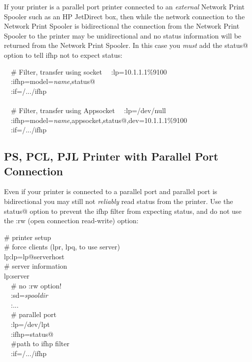 \documentclass[a4paper]{article}
\begin{document}
If your printer is a parallel port printer
connected to an {\itshape external\/} Network Print Spooler such as an HP JetDirect box,
then while the network connection to the Network Print Spooler is
bidirectional
the connection from the Network Print Spooler to the printer 
may be unidirectional
and no status information will be returned from the Network Print Spooler.
In this case you {\itshape must\/} add the {\ttfamily status@}
option to tell {\ttfamily ifhp} not to expect status:
\begin{tscreen}
~~\# Filter, transfer using socket
~~:lp=10.1.1.1\%9100 \\ 
~~:ifhp=model={\itshape name\/},status@\\ 
~~:if=/.../ifhp  \\ \\ 
~~\# Filter, transfer using Appsocket
~~:lp=/dev/null \\ 
~~:ifhp=model={\itshape name\/},appsocket,status@,dev=10.1.1.1\%9100 \\ 
~~:if=/.../ifhp  \\ 
\end{tscreen}



\subsection{PS, PCL, PJL Printer with Parallel Port Connection}

Even if your printer is connected to a parallel port
and parallel port is bidirectional
you may still not {\itshape reliably\/} read status from the printer.
Use the
{\ttfamily status@} option to prevent the
{\ttfamily ifhp} filter from expecting status,
and do not  use the
{\ttfamily :rw} (open connection read-write) option:
\begin{tscreen}
\# printer setup  \\ 
\#  force clients (lpr, lpq, to use server)  \\ 
lp:lp=lp@serverhost  \\ 
\# server information  \\ 
lp:server  \\ 
~~\# no :rw option! \\ 
~~:sd={\itshape spooldir\/}  \\ 
~~:...  \\ 
~~\# parallel port \\ 
~~:lp=/dev/lpt\\ 
~~:ifhp=status@ \\ 
~~\#path to ifhp filter  \\ 
~~:if=/.../ifhp  \\ 
\end{tscreen}
\end{document}

